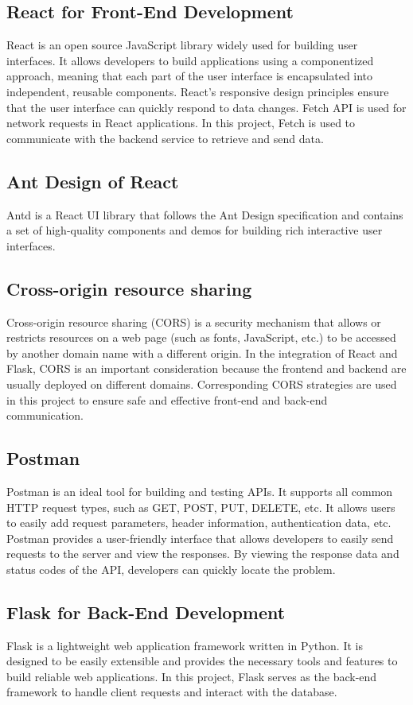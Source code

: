 \documentclass[journal]{IEEEtran}
\begin{document}
\subsection{React for Front-End Development }
React is an open source JavaScript library widely used for building user interfaces. It allows developers to build applications using a componentized approach, meaning that each part of the user interface is encapsulated into independent, reusable components. React's responsive design principles ensure that the user interface can quickly respond to data changes. Fetch API is used for network requests in React applications. In this project, Fetch is used to communicate with the backend service to retrieve and send data.

\subsection{Ant Design of React}
Antd is a React UI library that follows the Ant Design specification and contains a set of high-quality components and demos for building rich interactive user interfaces.

\subsection{Cross-origin resource sharing}
Cross-origin resource sharing (CORS) is a security mechanism that allows or restricts resources on a web page (such as fonts, JavaScript, etc.) to be accessed by another domain name with a different origin. In the integration of React and Flask, CORS is an important consideration because the frontend and backend are usually deployed on different domains. Corresponding CORS strategies are used in this project to ensure safe and effective front-end and back-end communication.

\subsection{Postman}
Postman is an ideal tool for building and testing APIs. It supports all common HTTP request types, such as GET, POST, PUT, DELETE, etc. It allows users to easily add request parameters, header information, authentication data, etc. Postman provides a user-friendly interface that allows developers to easily send requests to the server and view the responses. By viewing the response data and status codes of the API, developers can quickly locate the problem.

\subsection{Flask for Back-End Development}
Flask is a lightweight web application framework written in Python. It is designed to be easily extensible and provides the necessary tools and features to build reliable web applications. In this project, Flask serves as the back-end framework to handle client requests and interact with the database.
\end{document}
